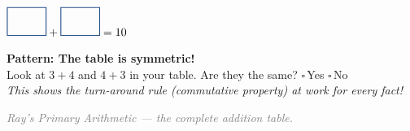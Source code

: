 \documentclass[12pt, letterpaper]{article}
\newcommand{\numbox}{\tikz{\draw[scholablue,thick](0,0)rectangle(1.2cm,0.85cm);}}
\begin{document}
\medskip\noindent\hspace{2em} $\numbox + \numbox = 10$

\bigskip

\begin{enrichbox}
\textbf{\textcolor{scholagreen}{Pattern: The table is symmetric!}}\\[3pt]
Look at $3 + 4$ and $4 + 3$ in your table. Are they the same? \quad$\square$\,Yes \; $\square$\,No\\[3pt]
\textit{This shows the turn-around rule (commutative property) at work for every fact!}
\end{enrichbox}

\vspace{0.3cm}
\noindent\textcolor{gray}{\small\textit{Ray's Primary Arithmetic — the complete addition table.}}
\end{document}
